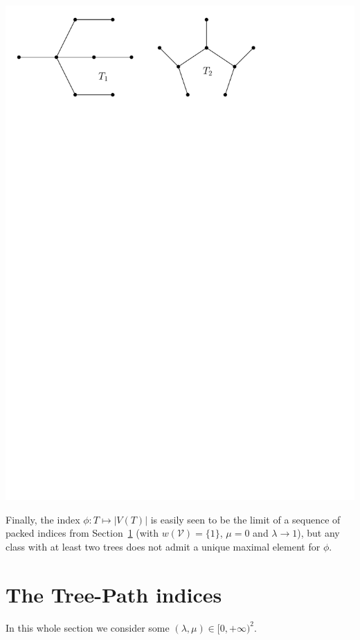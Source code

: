 \documentclass[11 pt]{modarticle}
\newcommand{\vset}{\mathcal{V}}
\newcommand{\wmap}{w}
\newcommand{\size}[1]{|#1|}
\newcommand{\vsetof}[1]{V(#1)}
\begin{document}
\begin{center}
	\includegraphics[scale=0.5]{figures/counter-example}
\end{center}

Finally, the index $\phi\colon T \mapsto \size{\vsetof{T}}$ is easily seen to be the limit of a sequence of packed indices from Section~\ref{section:tp-indices} (with $\wmap(\vset)= \{1\}$, $\mu = 0$ and $\lambda \rightarrow 1$), but any class with at least two trees does not admit a unique maximal element for $\phi$. 




\section{The Tree-Path indices}\label{section:tp-indices}

In this whole section we consider some $(\lambda, \mu) \in [0,+\infty)^2$.
\end{document}
